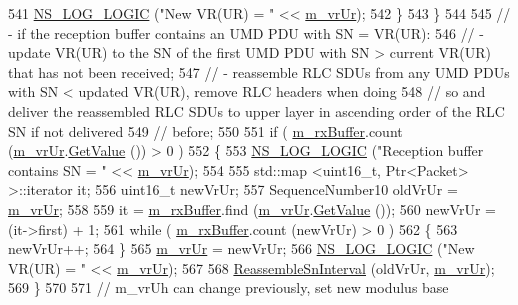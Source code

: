 \begin{DoxyCode}
541           \hyperlink{group__logging_ga88acd260151caf2db9c0fc84997f45ce}{NS\_LOG\_LOGIC} (\textcolor{stringliteral}{"New VR(UR) = "} << \hyperlink{classns3_1_1LteRlcUm_a04515ea87c413d29a9be9b0a085f5d64}{m\_vrUr});
542         \}
543     \}
544 
545   \textcolor{comment}{// - if the reception buffer contains an UMD PDU with SN = VR(UR):}
546   \textcolor{comment}{//    - update VR(UR) to the SN of the first UMD PDU with SN > current VR(UR) that has not been received;}
547   \textcolor{comment}{//    - reassemble RLC SDUs from any UMD PDUs with SN < updated VR(UR), remove RLC headers when doing}
548   \textcolor{comment}{//      so and deliver the reassembled RLC SDUs to upper layer in ascending order of the RLC SN if not
       delivered}
549   \textcolor{comment}{//      before;}
550 
551   \textcolor{keywordflow}{if} ( \hyperlink{classns3_1_1LteRlcUm_aa4611282929afb798d591eafca1e6adb}{m\_rxBuffer}.count (\hyperlink{classns3_1_1LteRlcUm_a04515ea87c413d29a9be9b0a085f5d64}{m\_vrUr}.\hyperlink{classns3_1_1SequenceNumber10_a9dcaea04bc415e169e7e0020ce579d01}{GetValue} ()) > 0 )
552     \{
553       \hyperlink{group__logging_ga88acd260151caf2db9c0fc84997f45ce}{NS\_LOG\_LOGIC} (\textcolor{stringliteral}{"Reception buffer contains SN = "} << \hyperlink{classns3_1_1LteRlcUm_a04515ea87c413d29a9be9b0a085f5d64}{m\_vrUr});
554 
555       std::map <uint16\_t, Ptr<Packet> >::iterator it;
556       uint16\_t newVrUr;
557       SequenceNumber10 oldVrUr = \hyperlink{classns3_1_1LteRlcUm_a04515ea87c413d29a9be9b0a085f5d64}{m\_vrUr};
558 
559       it = \hyperlink{classns3_1_1LteRlcUm_aa4611282929afb798d591eafca1e6adb}{m\_rxBuffer}.find (\hyperlink{classns3_1_1LteRlcUm_a04515ea87c413d29a9be9b0a085f5d64}{m\_vrUr}.\hyperlink{classns3_1_1SequenceNumber10_a9dcaea04bc415e169e7e0020ce579d01}{GetValue} ());
560       newVrUr = (it->first) + 1;
561       \textcolor{keywordflow}{while} ( \hyperlink{classns3_1_1LteRlcUm_aa4611282929afb798d591eafca1e6adb}{m\_rxBuffer}.count (newVrUr) > 0 )
562         \{
563           newVrUr++;
564         \}
565       \hyperlink{classns3_1_1LteRlcUm_a04515ea87c413d29a9be9b0a085f5d64}{m\_vrUr} = newVrUr;
566       \hyperlink{group__logging_ga88acd260151caf2db9c0fc84997f45ce}{NS\_LOG\_LOGIC} (\textcolor{stringliteral}{"New VR(UR) = "} << \hyperlink{classns3_1_1LteRlcUm_a04515ea87c413d29a9be9b0a085f5d64}{m\_vrUr});
567 
568       \hyperlink{classns3_1_1LteRlcUm_a6c396626a8b5e65d70783e603486c832}{ReassembleSnInterval} (oldVrUr, \hyperlink{classns3_1_1LteRlcUm_a04515ea87c413d29a9be9b0a085f5d64}{m\_vrUr});
569     \}
570 
571   \textcolor{comment}{// m\_vrUh can change previously, set new modulus base}

\end{DoxyCode}
